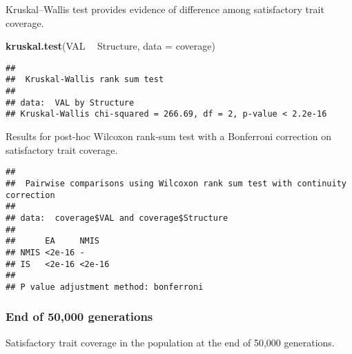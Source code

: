 \documentclass[]{book}
\newenvironment{Shaded}{\begin{snugshade}}{\end{snugshade}}
\newcommand{\DataTypeTok}[1]{\textcolor[rgb]{0.13,0.29,0.53}{#1}}
\newcommand{\KeywordTok}[1]{\textcolor[rgb]{0.13,0.29,0.53}{\textbf{#1}}}
\newcommand{\NormalTok}[1]{#1}
\newcommand{\OperatorTok}[1]{\textcolor[rgb]{0.81,0.36,0.00}{\textbf{#1}}}
\newcommand{\OtherTok}[1]{\textcolor[rgb]{0.56,0.35,0.01}{#1}}
\newcommand{\StringTok}[1]{\textcolor[rgb]{0.31,0.60,0.02}{#1}}
\begin{document}
Kruskal--Wallis test provides evidence of difference among satisfactory trait coverage.

\begin{Shaded}
\begin{Highlighting}[]
\KeywordTok{kruskal.test}\NormalTok{(VAL }\OperatorTok{~}\StringTok{ }\NormalTok{Structure, }\DataTypeTok{data =}\NormalTok{ coverage)}
\end{Highlighting}
\end{Shaded}

\begin{verbatim}
## 
##  Kruskal-Wallis rank sum test
## 
## data:  VAL by Structure
## Kruskal-Wallis chi-squared = 266.69, df = 2, p-value < 2.2e-16
\end{verbatim}

Results for post-hoc Wilcoxon rank-sum test with a Bonferroni correction on satisfactory trait coverage.

\begin{Shaded}
\end{Shaded}

\begin{verbatim}
## 
##  Pairwise comparisons using Wilcoxon rank sum test with continuity correction 
## 
## data:  coverage$VAL and coverage$Structure 
## 
##      EA     NMIS  
## NMIS <2e-16 -     
## IS   <2e-16 <2e-16
## 
## P value adjustment method: bonferroni
\end{verbatim}

\hypertarget{end-of-50000-generations-4}{%
\subsubsection{End of 50,000 generations}\label{end-of-50000-generations-4}}

Satisfactory trait coverage in the population at the end of 50,000 generations.
\end{document}
